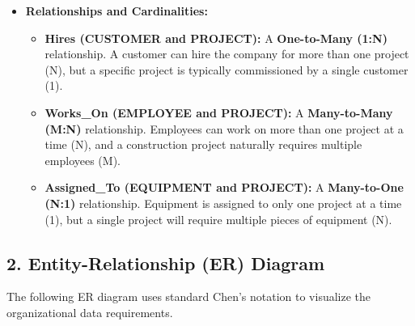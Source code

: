 \documentclass[12pt,a3paper]{article}
\begin{document}
\begin{enumerate}
\begin{tcolorbox}[enhanced,breakable,ansbox,colback=cA!4,colframe=cA,boxrule=0.8pt,arc=5pt,title={\textbf{Answer}},fonttitle=\bfseries\color{white},colbacktitle=cA]
\begin{itemize}[leftmargin=2em, itemsep=0.5em]
    \item \textbf{Relationships and Cardinalities:}
    \begin{itemize}[label={--}, itemsep=1pt]
        \item \textbf{Hires (CUSTOMER and PROJECT):} A \textbf{One-to-Many (1:N)} relationship. A customer can hire the company for more than one project (N), but a specific project is typically commissioned by a single customer (1).
        \item \textbf{Works\_On (EMPLOYEE and PROJECT):} A \textbf{Many-to-Many (M:N)} relationship. Employees can work on more than one project at a time (N), and a construction project naturally requires multiple employees (M).
        \item \textbf{Assigned\_To (EQUIPMENT and PROJECT):} A \textbf{Many-to-One (N:1)} relationship. Equipment is assigned to only one project at a time (1), but a single project will require multiple pieces of equipment (N).
    \end{itemize}
\end{itemize}

\vspace{1em}
\subsection*{2. Entity-Relationship (ER) Diagram}

The following ER diagram uses standard Chen's notation to visualize the organizational data requirements.

\vspace{1.5em}
\begin{center}
\end{center}
\end{tcolorbox}
\end{enumerate}
\end{document}
